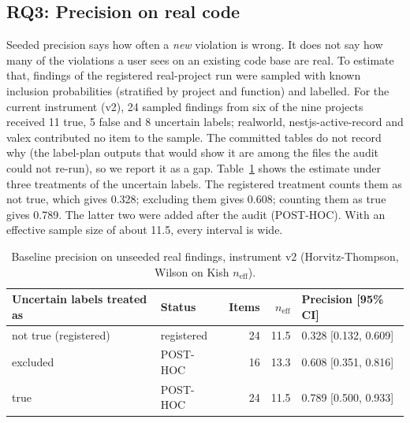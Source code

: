 \documentclass[10pt,a4paper]{article}
\begin{document}
\subsection{RQ3: Precision on real code}\label{sec:rq3}

Seeded precision says how often a \emph{new} violation is wrong. It does not say how many of the violations a
user sees on an existing code base are real. To estimate that, findings of the registered real-project run were
sampled with known inclusion probabilities (stratified by project and function) and labelled. For the current
instrument (v2), 24 sampled findings from six of the nine projects received 11 true, 5 false and 8 uncertain
labels; realworld, nestjs-active-record and valex contributed no item to the sample. The committed tables do not
record why (the label-plan outputs that would show it are among the files the audit could not re-run), so we
report it as a gap.
Table~\ref{tab:baseline} shows the estimate under three treatments of the uncertain labels. The registered
treatment counts them as not true, which gives 0.328; excluding them gives 0.608; counting them as true gives 0.789.
The latter two were added after the audit (POST-HOC). With an effective sample size of about 11.5, every interval is
wide.

\begin{table}[t]
\centering
\caption{Baseline precision on unseeded real findings, instrument v2 (Horvitz-Thompson, Wilson on Kish $n_\mathrm{eff}$).}
\label{tab:baseline}
\small
\begin{tabular}{@{}llrrl@{}}
\toprule
Uncertain labels treated as & Status & Items & $n_\mathrm{eff}$ & Precision [95\% CI] \\
\midrule
not true (registered) & registered & 24 & 11.5 & 0.328 [0.132, 0.609] \\
excluded & POST-HOC & 16 & 13.3 & 0.608 [0.351, 0.816] \\
true & POST-HOC & 24 & 11.5 & 0.789 [0.500, 0.933] \\
\bottomrule
\end{tabular}
\end{table}
\end{document}
